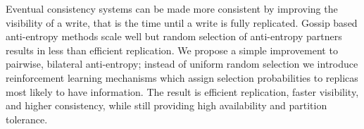 Eventual consistency systems can be made more consistent by improving the
visibility of a write, that is the time until a write is fully replicated.
Gossip based anti-entropy methods scale well but random selection of
anti-entropy partners results in less than efficient replication.
We propose a simple improvement to pairwise, bilateral anti-entropy; instead
of uniform random selection we introduce reinforcement learning mechanisms
which assign selection probabilities to replicas most likely to have
information.
The result is efficient replication, faster visibility, and higher
consistency, while still providing high availability and partition tolerance.
